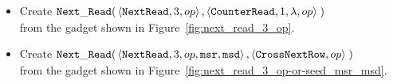 \begin{itemize}
    \item Create
    $\begin{aligned}[t]
        {\tt Next\_Read}(& \left\langle {\tt NextRead},    3,          op \right\rangle,
                    \left\langle {\tt CounterRead}, 1, \lambda, op \right\rangle \;)
    \end{aligned}$\\from the gadget shown in Figure~\ref{fig:next_read_3_op}.

    \item Create
    $\begin{aligned}[t]
        {\tt Next\_Read}(& \left\langle {\tt NextRead}, 3,  op, {\tt msr}, {\tt msd} \right\rangle,
                    \left\langle {\tt CrossNextRow}, op \right\rangle \;)
    \end{aligned}$\\from the gadget shown in Figure~\ref{fig:next_read_3_op-or-seed_msr_msd}.
\end{itemize}

